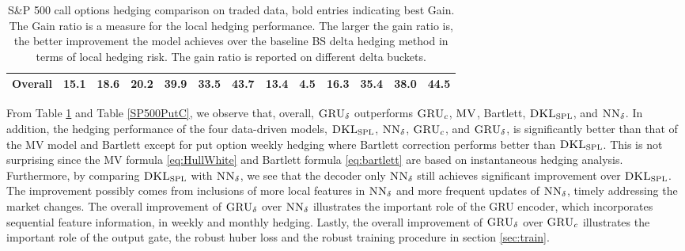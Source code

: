\documentclass[letterpaper,12pt,titlepage,oneside,final]{book}
\numberwithin{equation}{section}
\theoremstyle{definition}
\newcommand{\model}{\textsc{GRU}_\delta}
\newcommand{\modelN}{\textsc{NN}_\delta}
\newcommand{\DKLs}{\bf\textsc{DKL}_{\text{SPL}}}
\newcommand{\MV}{\bf \textsc{MV}}
\begin{document}
\begin{table}[htp!]
\begin{threeparttable}
\begin{tabular}{|c|cccccc| cccccc|}
			Overall&15.1&18.6 &20.2     &39.9 &33.5  &\textbf{43.7}    &13.4  & 4.5   &16.3 &35.4     &38.0    & \textbf{44.5}  \\
			\hline
		\end{tabular}
		\caption{S\&P 500 call options hedging comparison on traded data, bold entries indicating best Gain.  The Gain ratio is a measure for the local hedging performance. The larger the gain ratio is, the better improvement the model achieves over the baseline BS delta hedging method in terms of local hedging risk. The gain ratio is reported on different delta buckets.  }
\label{SP500CallC}
\end{threeparttable}
\end{table}


 From  Table \ref{SP500CallC} and Table \ref{SP500PutC},  we observe that, overall, $\model$ outperforms $\textsc{GRU}_{c}$, $\MV$, Bartlett, $\DKLs$, and $\modelN$. In addition,
 the hedging performance of the four data-driven models, $\DKLs$, $\modelN$, $\textsc{GRU}_{c}$, and $\model$, is   significantly better than that of the MV model and Bartlett except for put option weekly hedging where Bartlett correction performs better than $\DKLs$. This is not surprising since the MV formula \eqref{eq:HullWhite} and Bartlett formula \eqref{eq:bartlett} are based on instantaneous hedging analysis.  Furthermore, by comparing $\DKLs$ with $\modelN$, we  see that the decoder only $\modelN$ still achieves significant improvement over $\DKLs$. The improvement possibly comes from inclusions of more local features in $\modelN$ and more frequent updates of $\modelN$, timely addressing the market changes. The overall improvement of $\model$ over $\modelN$ illustrates the important role of the GRU encoder, which incorporates sequential feature information, in weekly and monthly hedging. Lastly,  the overall improvement of $\model$ over $\textsc{GRU}_{c}$ illustrates the important role of the output gate, the robust huber loss and the robust training procedure in section \ref{sec:train}.
\end{document}
